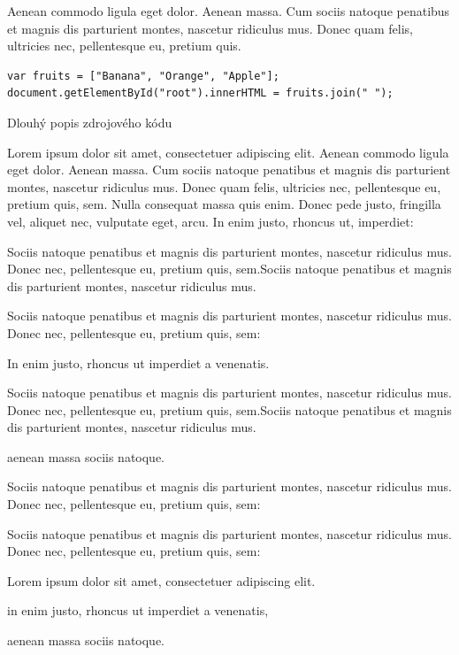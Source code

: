 Aenean commodo ligula eget dolor. Aenean massa. Cum sociis natoque penatibus et magnis dis parturient montes, nascetur ridiculus mus. Donec quam felis, ultricies nec, pellentesque eu, pretium quis.


\begin{fig:code}
	\begin{verbatim}
var fruits = ["Banana", "Orange", "Apple"];
document.getElementById("root").innerHTML = fruits.join(" ");
   \end{verbatim}
   \caption[Druhý příklad zdrojového kódu]{Dlouhý popis zdrojového kódu}\label{listing:example2}
\end{fig:code}


Lorem ipsum dolor sit amet, consectetuer adipiscing elit. Aenean commodo ligula eget dolor. Aenean massa. Cum sociis natoque penatibus et magnis dis parturient montes, nascetur ridiculus mus. Donec quam felis, ultricies nec, pellentesque eu, pretium quis, sem. Nulla consequat massa quis enim. Donec pede justo, fringilla vel, aliquet nec, vulputate eget, arcu. In enim justo, rhoncus ut, imperdiet:
\begin{ol}
	\item Sociis natoque penatibus et magnis dis parturient montes, nascetur ridiculus mus. Donec nec, pellentesque eu, pretium quis, sem.Sociis natoque penatibus et magnis dis parturient montes, nascetur ridiculus mus.
	
	Sociis natoque penatibus et magnis dis parturient montes, nascetur ridiculus mus. Donec nec, pellentesque eu, pretium quis, sem:
	
	\begin{ul}
		\item 
			In enim justo, rhoncus ut imperdiet a venenatis.

			Sociis natoque penatibus et magnis dis parturient montes, nascetur ridiculus mus. Donec nec, pellentesque eu, pretium quis, sem.Sociis natoque penatibus et magnis dis parturient montes, nascetur ridiculus mus.
		\item aenean massa sociis natoque.
	\end{ul}
	\item Sociis natoque penatibus et magnis dis parturient montes, nascetur ridiculus mus. Donec nec, pellentesque eu, pretium quis, sem:
	\item Sociis natoque penatibus et magnis dis parturient montes, nascetur ridiculus mus. Donec nec, pellentesque eu, pretium quis, sem:
\end{ol}
Lorem ipsum dolor sit amet, consectetuer adipiscing elit.
\begin{ul}
	\item in enim justo, rhoncus ut imperdiet a venenatis,
	\item aenean massa sociis natoque.
\end{ul}


